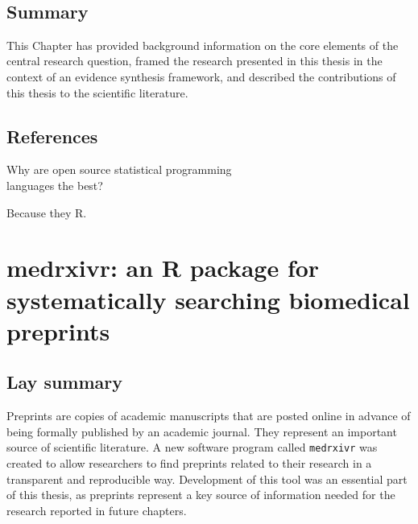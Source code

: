 \documentclass[a4paper, twoside]{templates/ociamthesis}
\begin{document}
~

\hypertarget{summary}{%
\section{Summary}\label{summary}}

This Chapter has provided background information on the core elements of the central research question, framed the research presented in this thesis in the context of an evidence synthesis framework, and described the contributions of this thesis to the scientific literature.

\newpage

\hypertarget{references}{%
\section{References}\label{references}}

\begin{savequote}
Why are open source statistical programming\\
languages the best?

Because they R.
\end{savequote}



\hypertarget{sys-rev-tools-heading}{%
\chapter{medrxivr: an R package for systematically searching biomedical preprints}\label{sys-rev-tools-heading}}

\minitoc 

\hypertarget{lay-summary-1}{%
\section{Lay summary}\label{lay-summary-1}}

Preprints are copies of academic manuscripts that are posted online in advance of being formally published by an academic journal. They represent an important source of scientific literature. A new software program called \texttt{medrxivr} was created to allow researchers to find preprints related to their research in a transparent and reproducible way. Development of this tool was an essential part of this thesis, as preprints represent a key source of information needed for the research reported in future chapters.
\end{document}
